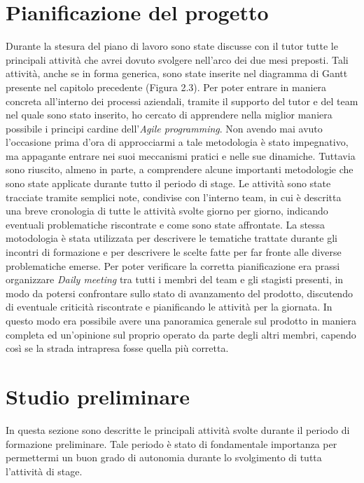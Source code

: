 \section{Pianificazione del progetto}
Durante la stesura del piano di lavoro sono state discusse con il tutor tutte le principali attività che avrei dovuto svolgere nell'arco dei due mesi preposti. Tali attività, anche se in forma generica, sono state inserite nel diagramma di Gantt presente nel capitolo precedente (Figura 2.3).
Per poter entrare in maniera concreta all'interno dei processi aziendali, tramite il supporto del tutor e del team nel quale sono stato inserito, ho cercato di apprendere nella miglior maniera possibile i principi cardine dell'\textit{Agile programming}. Non avendo mai avuto l'occasione prima d'ora di approcciarmi a tale metodologia è stato impegnativo, ma appagante entrare nei suoi meccanismi pratici e nelle sue dinamiche. Tuttavia sono riuscito, almeno in parte, a comprendere alcune importanti metodologie che sono state applicate durante tutto il periodo di stage. Le attività sono state tracciate tramite semplici note, condivise con l'interno team, in cui è descritta una breve cronologia di tutte le attività svolte giorno per giorno, indicando eventuali problematiche riscontrate e come sono state affrontate. La stessa motodologia è stata utilizzata per descrivere le tematiche trattate durante gli incontri di formazione e per descrivere le scelte fatte per far fronte alle diverse problematiche emerse.
Per poter verificare la corretta pianificazione era prassi organizzare \textit{Daily meeting} tra tutti i membri del team e gli stagisti presenti, in modo da potersi confrontare sullo stato di avanzamento del prodotto, discutendo di eventuale criticità riscontrate e pianificando le attività per la giornata. In questo modo era possibile avere una panoramica generale sul prodotto in maniera completa ed un'opinione sul proprio operato da parte degli altri membri, capendo così se la strada intrapresa fosse quella più corretta.
\section{Studio preliminare}
In questa sezione sono descritte le principali attività svolte durante il periodo di formazione preliminare. Tale periodo è stato di fondamentale importanza per permettermi un buon grado di autonomia durante lo svolgimento di tutta l'attività di stage.
